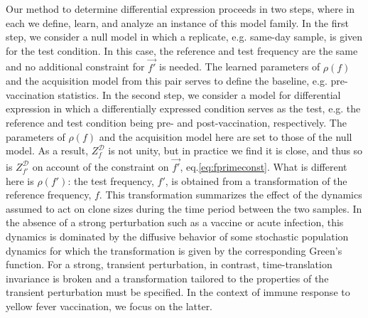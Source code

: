\documentclass[letterpaper,english,prl,reprint,longbibliography]{revtex4-1} %
\begin{document}
Our method to determine differential expression proceeds in two steps, where in each we define, learn, and analyze an instance of this model family.
In the first step, we consider a null model in which a replicate, e.g. same-day sample, is given for the test condition. 
In this case, the reference and test frequency are the same and no additional constraint for $\vec{f'}$ is needed.
The learned parameters of $\rho(f)$ and the acquisition model from this pair serves to define the baseline, e.g. pre-vaccination statistics.
In the second step, we consider a model for differential expression in which a differentially expressed condition serves as the test, e.g. the reference and test condition being pre- and post-vaccination, respectively. 
The parameters of $\rho(f)$ and the acquisition model here are set to those of the null model. 
As a result, $Z^\mathcal{D}_f$ is not unity, but in practice we find it is close, and thus so is $Z^\mathcal{D}_{f'}$ on account of the constraint on $\vec{f'}$, eq.\ref{eq:fprimeconst}.  
What is different here is $\rho(f')$: the test frequency, $f'$, is obtained from a transformation of the reference frequency, $f$.  
This transformation summarizes the effect of the dynamics assumed to act on clone sizes during the time period between the two samples. 
In the absence of a strong perturbation such as a vaccine or acute infection, this dynamics is dominated by the diffusive behavior of some stochastic population dynamics for which the transformation is given by the corresponding Green's function.  
For a strong, transient perturbation, in contrast, time-translation invariance is broken and a transformation tailored to the properties of the transient perturbation must be specified. 
In the context of immune response to yellow fever vaccination, we focus on the latter. 
\end{document}
